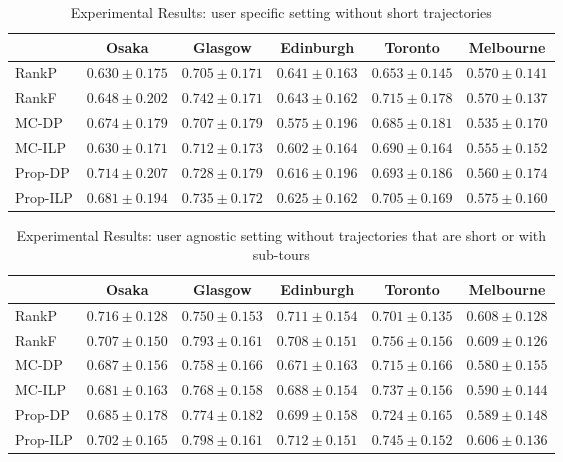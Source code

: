 \begin{table*}
    \centering
    \caption{Experimental Results: user specific setting without short trajectories}
    \begin{tabular}{l|ccccc} \hline
         & Osaka & Glasgow & Edinburgh & Toronto & Melbourne \\ \hline
        RankP & $0.630\pm0.175$ & $0.705\pm0.171$ & $0.641\pm0.163$ & $0.653\pm0.145$ & $0.570\pm0.141$ \\
        RankF & $0.648\pm0.202$ & $\mathbf{0.742\pm0.171}$ & $\mathbf{0.643\pm0.162}$ & $\mathbf{0.715\pm0.178}$ & $0.570\pm0.137$ \\
        MC-DP & $0.674\pm0.179$ & $0.707\pm0.179$ & $0.575\pm0.196$ & $0.685\pm0.181$ & $0.535\pm0.170$ \\
        MC-ILP & $0.630\pm0.171$ & $0.712\pm0.173$ & $0.602\pm0.164$ & $0.690\pm0.164$ & $0.555\pm0.152$ \\
        Prop-DP & $\mathbf{0.714\pm0.207}$ & $0.728\pm0.179$ & $0.616\pm0.196$ & $0.693\pm0.186$ & $0.560\pm0.174$ \\
        Prop-ILP & $0.681\pm0.194$ & $0.735\pm0.172$ & $0.625\pm0.162$ & $0.705\pm0.169$ & $\mathbf{0.575\pm0.160}$ \\
        \hline
    \end{tabular}
\end{table*}

\begin{table*}
    \centering
    \caption{Experimental Results: user agnostic setting without trajectories that are short or with sub-tours}
    \begin{tabular}{l|ccccc} \hline
         & Osaka & Glasgow & Edinburgh & Toronto & Melbourne \\ \hline
        RankP & $\mathbf{0.716\pm0.128}$ & $0.750\pm0.153$ & $0.711\pm0.154$ & $0.701\pm0.135$ & $0.608\pm0.128$ \\
        RankF & $0.707\pm0.150$ & $0.793\pm0.161$ & $0.708\pm0.151$ & $\mathbf{0.756\pm0.156}$ & $\mathbf{0.609\pm0.126}$ \\
        MC-DP & $0.687\pm0.156$ & $0.758\pm0.166$ & $0.671\pm0.163$ & $0.715\pm0.166$ & $0.580\pm0.155$ \\
        MC-ILP & $0.681\pm0.163$ & $0.768\pm0.158$ & $0.688\pm0.154$ & $0.737\pm0.156$ & $0.590\pm0.144$ \\
        Prop-DP & $0.685\pm0.178$ & $0.774\pm0.182$ & $0.699\pm0.158$ & $0.724\pm0.165$ & $0.589\pm0.148$ \\
        Prop-ILP & $0.702\pm0.165$ & $\mathbf{0.798\pm0.161}$ & $\mathbf{0.712\pm0.151}$ & $0.745\pm0.152$ & $0.606\pm0.136$ \\
        \hline
    \end{tabular}
\end{table*}

